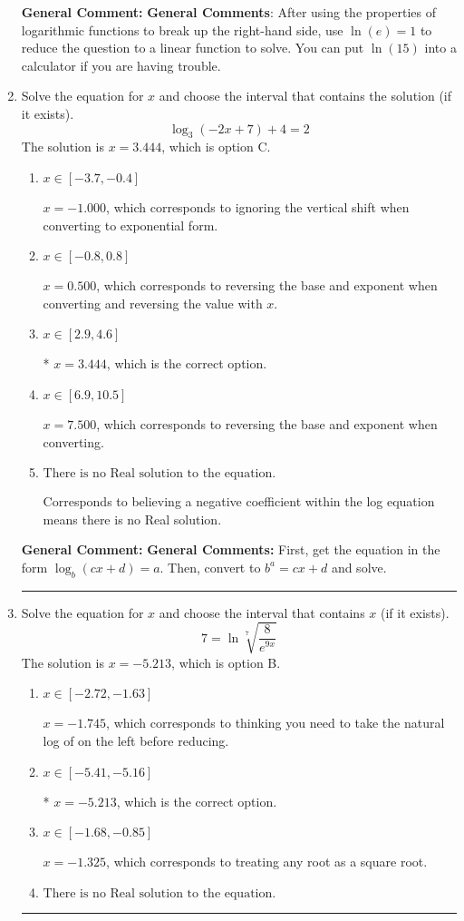 \documentclass{extbook}[14pt]
\newcommand{\litem}[1]{\item #1

\rule{\textwidth}{0.4pt}}
\begin{document}
\begin{enumerate}
{\textbf{General Comment:} \textbf{General Comments}: After using the properties of logarithmic functions to break up the right-hand side, use $\ln(e) = 1$ to reduce the question to a linear function to solve. You can put $\ln(15)$ into a calculator if you are having trouble.
}
\litem{
Solve the equation for $x$ and choose the interval that contains the solution (if it exists).
\[ \log_{3}{(-2x+7)}+4 = 2 \]The solution is \( x = 3.444 \), which is option C.\begin{enumerate}[label=\Alph*.]
\item \( x \in [-3.7, -0.4] \)

$x = -1.000$, which corresponds to ignoring the vertical shift when converting to exponential form.
\item \( x \in [-0.8, 0.8] \)

$x = 0.500$, which corresponds to reversing the base and exponent when converting and reversing the value with $x$.
\item \( x \in [2.9, 4.6] \)

* $x = 3.444$, which is the correct option.
\item \( x \in [6.9, 10.5] \)

$x = 7.500$, which corresponds to reversing the base and exponent when converting.
\item \( \text{There is no Real solution to the equation.} \)

Corresponds to believing a negative coefficient within the log equation means there is no Real solution.
\end{enumerate}

\textbf{General Comment:} \textbf{General Comments:} First, get the equation in the form $\log_b{(cx+d)} = a$. Then, convert to $b^a = cx+d$ and solve.
}
\litem{
 Solve the equation for $x$ and choose the interval that contains $x$ (if it exists).
\[  7 = \ln{\sqrt[7]{\frac{8}{e^{9x}}}} \]The solution is \( x = -5.213 \), which is option B.\begin{enumerate}[label=\Alph*.]
\item \( x \in [-2.72, -1.63] \)

$x = -1.745$, which corresponds to thinking you need to take the natural log of on the left before reducing.
\item \( x \in [-5.41, -5.16] \)

* $x = -5.213$, which is the correct option.
\item \( x \in [-1.68, -0.85] \)

$x = -1.325$, which corresponds to treating any root as a square root.
\item \( \text{There is no Real solution to the equation.} \)


\end{enumerate}}
\end{enumerate}
\end{document}
